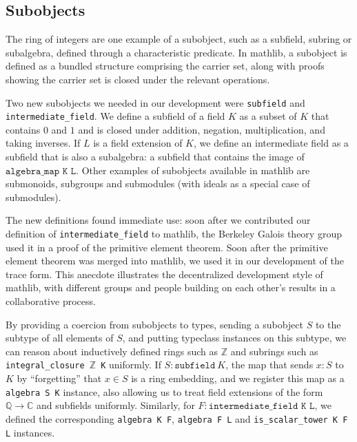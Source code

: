 \documentclass[a4paper,USenglish,cleveref, autoref, thm-restate]{lipics-v2021}
\newcommand{\C}{\mathbb{C}}
\newcommand{\lean}[1]{\texttt{#1}\xspace} %
\newcommand{\mathlib}{\textsf{mathlib}\xspace}
\newcommand{\Q}{\mathbb{Q}}
\newcommand{\Z}{\mathbb{Z}}
\begin{document}

\subsection{Subobjects} \label{sec:subobjects}

The ring of integers are one example of a subobject, such as a subfield, subring or subalgebra, defined through a characteristic predicate.
In mathlib, a subobject is defined as a bundled structure comprising the carrier set,
along with proofs showing the carrier set is closed under the relevant operations.

Two new subobjects we needed in our development were \lean{subfield} and \lean{intermediate\-\_field}.
We define a subfield of a field $K$ as a subset of $K$ that contains $0$ and $1$ and is closed under addition, negation, multiplication, and taking inverses.
If $L$ is a field extension of $K$, we define an intermediate field as a subfield that is also a subalgebra: a subfield that contains the image of $\lean{algebra\_map K L}$.
Other examples of subobjects available in mathlib are submonoids, subgroups and submodules (with ideals as a special case of submodules).

The new definitions found immediate use:
soon after we contributed our definition of \lean{intermediate\_field} to \mathlib,
the Berkeley Galois theory group used it in a proof of the primitive element theorem.
Soon after the primitive element theorem was merged into \mathlib,
we used it in our development of the trace form.
This anecdote illustrates the decentralized development style of \mathlib,
with different groups and people building on each other's results in a collaborative process.

By providing a coercion from subobjects to types, sending a subobject $S$ to the subtype of all elements of $S$,
and putting typeclass instances on this subtype,
we can reason about inductively defined rings such as $\Z$ and subrings such as \lean{integral\_closure $\Z$ K} uniformly.
If $S : \lean{subfield}\ K$, the map that sends $x : S$ to $K$ by ``forgetting'' that $x \in S$ is a ring embedding,
and we register this map as a \lean{algebra S K} instance, also allowing us to treat field extensions of the form $\Q \to \C$ and subfields uniformly.
Similarly, for $F : \lean{intermediate\_field K L}$, we defined the corresponding \lean{algebra K F}, \lean{algebra F L} and \lean{is\_scalar\_tower K F L} instances.
\end{document}
